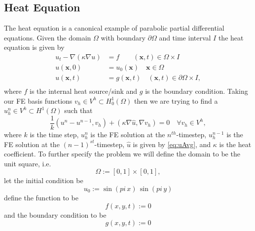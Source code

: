 \subsection{Heat Equation} \label{sse:Heat}
    The heat equation is a canonical example of parabolic partial differential
    equations. Given the domain $\Omega$ with boundary $\partial \Omega$ and
    time interval $I$ the heat equation is given by
    \begin{equation}
        \begin{split}
            u_t - \nabla \left( \kappa \nabla u \right) &= f
                \qquad (\mathbf{x}, t)\in \Omega \times I \\
            u(\mathbf{x}, 0) &= u_0(\mathbf{x}) \quad \mathbf{x} \in \Omega \\
            u(\mathbf{x}, t) &= g(\mathbf{x},t) \quad (\mathbf{x}, t)\in
                \partial\Omega \times I, \\
        \end{split}
        \label{eq:Heat}
    \end{equation}
    where $f$ is the internal heat source/sink and $g$ is the boundary
    condition. Taking our FE basis functions $v_h\in V^h\subset H^1_0(\Omega)$
    then we are trying to find a $u^n_h \in V^h \subset H^1(\Omega)$ such that
    \begin{equation}
        \frac{1}{k} (u^n - u^{n-1}, v_h) + (\kappa \nabla \hat{u}, \nabla v_h) =
        0 \quad \forall v_h \in V^h,
        \label{eq:WeakHeat}
    \end{equation}
    where $k$ is the time step, $u^n_h$ is the FE solution at the
    $n^{th}$-timestep, $u^{n-1}_h$ is the FE solution at the
    $(n-1)^{st}$-timestep, $\hat{u}$ is given by \eqref{eq:uAvg}, and $\kappa$
    is the heat coefficient. To further
    specify the problem we will define the domain to be the unit square, i.e.
    \begin{equation}
        \Omega := [0, 1] \times [0, 1],
        \label{eq:HeatDomain}
    \end{equation}
    let the initial condition be
    \begin{equation}
        u_0 := \sin(pi\, x)\, \sin(pi\, y)
        \label{eq:HeatIC}
    \end{equation}
    define the function to be
    \begin{equation}
        f(x,y,t) := 0
        \label{eq:HeatSource}
    \end{equation}
    and the boundary condition to be
    \begin{equation}
        g(x,y,t) := 0
        \label{eq:HeatBC}
    \end{equation}

